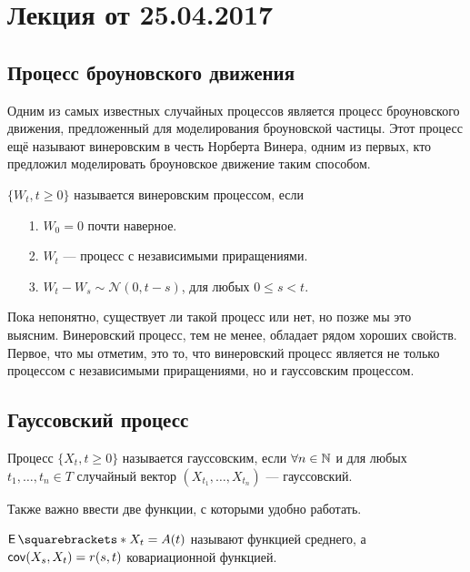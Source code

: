 \section{Лекция от 25.04.2017}

\subsection{Процесс броуновского движения}

Одним из самых известных случайных процессов является процесс броуновского
движения, предложенный для моделирования броуновской частицы. Этот процесс
ещё называют винеровским в честь Норберта Винера, одним из первых, кто предложил
моделировать броуновское движение таким способом.

\begin{definition}
  $\{W_t, t \geq 0\}$ называется винеровским процессом, если
  \begin{itemize}
    \item[1.] $W_0 = 0$ почти наверное.
    \item[2.] $W_t$ --- процесс с независимыми приращениями.
    \item[3.] $W_t - W_s \sim \mathcal{N}(0, t - s)$, для любых $0\leq s < t$.
  \end{itemize}
\end{definition}

Пока непонятно, существует ли такой процесс или нет, но позже мы это выясним.
Винеровский процесс, тем не менее, обладает рядом хороших свойств. Первое, что
мы отметим, это то, что винеровский процесс является не только процессом с независимыми
приращениями, но и гауссовским процессом.

\subsection{Гауссовский процесс}

\begin{definition}
  Процесс $\{X_t, t \geq 0\}$ называется гауссовским, если $\forall n \in \mathbb{N}$ и
  для любых $t_1, \ldots, t_n \in T$ случайный вектор $(X_{t_1}, \ldots, X_{t_n})$
  --- гауссовский.
\end{definition}

Также важно ввести две функции, с которыми удобно работать.

\begin{definition}
  $\E{X_t} = A(t)$ называют функцией среднего, а $\operatorname{\mathsf{cov}}(X_s, X_t) = r(s, t)$
  ковариационной функцией.
\end{definition}

